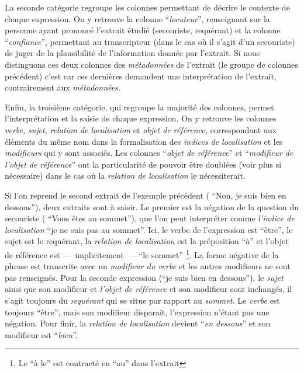 La seconde catégorie regroupe les colonnes permettant de décrire le
contexte de chaque expression. On y retrouve la colonne
\enquote{\emph{locuteur}}, renseignant sur la personne ayant prononcé
l'extrait étudié (\eg secouriste, requérant) et la colonne
\enquote{\emph{confiance}}, permettant au transcripteur (dans le cas
où il s'agit d'un secouriste) de juger de la plausibilité de
l'information donnée par l'extrait. Si nous distinguons ces deux
colonnes des \emph{métadonnées} de l'extrait (\ie le groupe de
colonnes précédent) c'est car ces dernières demandent une
interprétation de l'extrait, contrairement aux \emph{métadonnées.}

Enfin, la troisième catégorie, qui regroupe la majorité des colonnes,
permet l'interprétation et la saisie de chaque expression. On y
retrouve les colonnes \emph{verbe,} \emph{sujet,} \emph{relation de
  localisation} et \emph{objet de référence,} correspondant aux
éléments du même nom dans la formalisation des \emph{indices de
  localisation} et les \emph{modifieurs} qui y sont associés. Les
colonnes \enquote{\emph{objet de référence}} et
\enquote{\emph{modifieur de l'objet de référence}} ont la
particularité de pouvoir être doublées (voir plus si nécessaire) dans
le cas où la \emph{relation de localisation} le nécessiterait.

Si l'on reprend le second extrait de l'exemple précédent (\ie
\enquote{Non, je suis bien en dessous}), deux extraits sont à
saisir. Le premier est la négation de la question du secouriste (\ie
\enquote{Vous êtes au sommet}), que l'on peut interpréter comme
\emph{l'indice de localisation} \enquote{je ne suis pas au
  sommet}. Ici, le verbe de l'expression est \enquote{être}, le sujet
est le requérant, la \emph{relation de localisation} est la
préposition \enquote{à} et l'objet de référence est
---~implicitement~--- \enquote{le sommet} \footnote{Le \enquote{à le}
  est contracté en \enquote{au} dans l'extrait}. La forme négative de
la phrase est transcrite avec un \emph{modifieur du verbe} et les
autres modifieurs ne sont pas renseignés. Pour la seconde expression
(\ie \enquote{je suis bien en dessous}), le \emph{sujet} ainsi que son
modifieur et \emph{l'objet de référence} et son modifieur sont
inchangés, il s'agit toujours du \emph{requérant} qui se situe par
rapport au \emph{sommet.} Le \emph{verbe} est toujours \enquote{être},
mais son modifieur disparait, l'expression n'étant pas une
négation. Pour finir, la \emph{relation de localisation} devient
\enquote{\emph{en dessous}} et son modifieur est
\enquote{\emph{bien}}.

